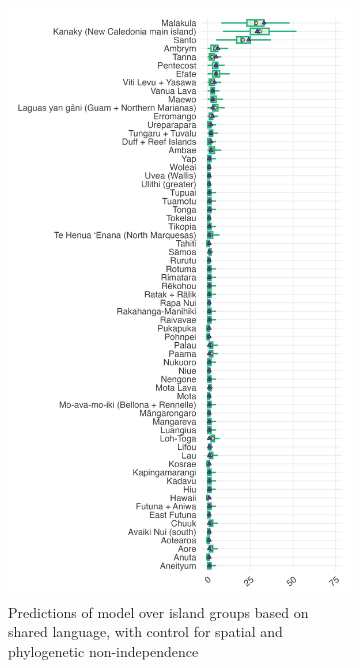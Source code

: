 \documentclass[unnumsec,webpdf,modern,medium]{oup-authoring-template}
\begin{document}
\begin{figure}
\centering
\begin{subfigure}{0.48\textwidth}
  \centering
\includegraphics[width=1\textwidth]{brms_predict_medium_control_spatialphylo.png}
\caption{Predictions of model over island groups based on shared language, with control for spatial and phylogenetic non-independence}
\label{medium_model_predict}
\end{subfigure}%
\hfill
\begin{subfigure}{0.48\textwidth}
  \centering

\end{subfigure}
\end{figure}
\end{document}
